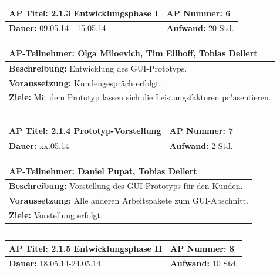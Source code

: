 \documentclass[fontsize=12pt,paper=a4,twoside]{scrartcl}
\begin{document}
\begin{verbatim}

\end{verbatim}
\begin{tabular}{|p{7.43cm}|p{7.43cm}|}
\hline
\textbf{AP Titel: }2.1.3 Entwicklungsphase I & \textbf{AP Nummer: }6 \\ 
\hline
\textbf{Dauer: }09.05.14 - 15.05.14 & \textbf{Aufwand: }20 Std.\\
\hline
\end{tabular}
\begin{tabular}{|p{15.3cm}|}
\hline
\textbf{AP-Teilnehmer: }Olga Miloevich, Tim Ellhoff, Tobias Dellert\\
\hline
\textbf{Beschreibung: }Entwicklung des GUI-Prototyps.\\
\hline
\textbf{Voraussetzung: }Kundengespräch erfolgt.\\
\hline 
\textbf{Ziele: }Mit dem Prototyp lassen sich die Leistungsfaktoren pr"asentieren.\\
\hline 
\end{tabular}
\begin{verbatim}

\end{verbatim}
\begin{tabular}{|p{7.43cm}|p{7.43cm}|}
\hline
\textbf{AP Titel: }2.1.4 Prototyp-Vorstellung & \textbf{AP Nummer: }7\\ 
\hline
\textbf{Dauer: }xx.05.14 & \textbf{Aufwand: }2 Std.\\
\hline
\end{tabular}
\begin{tabular}{|p{15.3cm}|}
\hline
\textbf{AP-Teilnehmer: }Daniel Pupat, Tobias Dellert\\
\hline
\textbf{Beschreibung: }Vorstellung des GUI-Prototyps für den Kunden. \\
\hline
\textbf{Voraussetzung: }Alle anderen Arbeitspakete zum GUI-Abschnitt.\\
\hline 
\textbf{Ziele: } Vorstellung erfolgt.\\
\hline 
\end{tabular}
\begin{verbatim}

\end{verbatim}
\begin{tabular}{|p{7.43cm}|p{7.43cm}|}
\hline
\textbf{AP Titel: }2.1.5 Entwicklungsphase II & \textbf{AP Nummer: }8 \\ 
\hline
\textbf{Dauer: }18.05.14-24.05.14 & \textbf{Aufwand: }10 Std.\\
\hline
\end{tabular}
\end{document}
